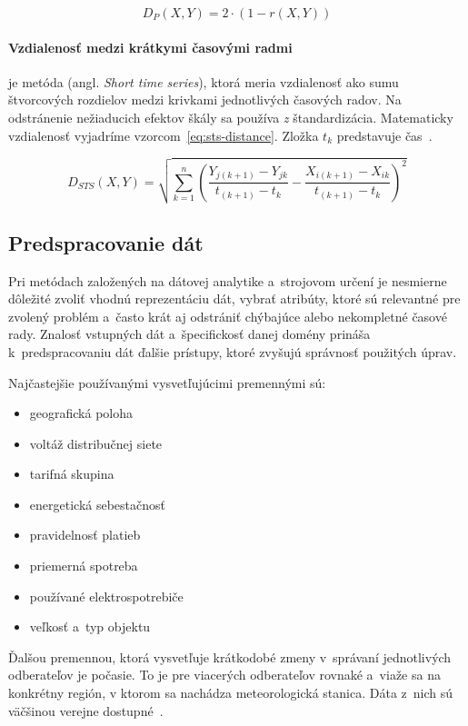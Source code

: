 \documentclass[a4paper,twoside,slovak,12pt,appendix]{article}
\begin{document}
\begin{equation}
	\label{eq:distance-golay}
  D_P \left( X, Y \right) = 2 \cdot \left( 1 - r \left( X, Y \right) \right)
\end{equation}

\paragraph{Vzdialenosť medzi krátkymi časovými radmi} je metóda (angl.
\textit{Short time series}), ktorá meria vzdialenosť ako sumu štvorcových
rozdielov medzi krivkami jednotlivých časových radov. Na odstránenie nežiaducich
efektov škály sa používa \textit{z} štandardizácia. Matematicky vzdialenosť
vyjadríme vzorcom~\ref{eq:sts-distance}. Zložka $t_k$ predstavuje
čas~\cite{WarrenLiao2005}.

\begin{equation}
	\label{eq:sts-distance}
  D_{STS} \left( X, Y \right) = \sqrt{ \sum_{k=1}^{n} \left(
    \frac{Y_{j \left( k+1 \right)} - Y_{jk}}{t_{\left( k+1 \right)} - t_k} -
    \frac{X_{i \left( k+1 \right)} - X_{ik}}{t_{\left( k+1 \right)} - t_k}
   \right)^2 }
\end{equation}


\subsection{Predspracovanie dát}
Pri metódach založených na dátovej analytike a~strojovom určení je nesmierne
dôležité zvoliť vhodnú reprezentáciu dát, vybrať atribúty, ktoré sú relevantné
pre zvolený problém a~často krát aj odstrániť chýbajúce alebo nekompletné časové
rady. Znalosť vstupných dát a~špecifickosť danej domény prináša
k~predspracovaniu dát ďalšie prístupy, ktoré zvyšujú správnosť použitých úprav.

Najčastejšie používanými vysvetľujúcimi premennými sú:
\begin{itemize}
  \item geografická poloha
  \item voltáž distribučnej siete
  \item tarifná skupina
  \item energetická sebestačnosť
  \item pravidelnosť platieb
  \item priemerná spotreba
  \item používané elektrospotrebiče
  \item veľkosť a~typ objektu
\end{itemize}
Ďalšou premennou, ktorá vysvetľuje krátkodobé zmeny v~správaní jednotlivých
odberateľov je počasie. To je pre viacerých odberateľov rovnaké a~viaže sa na
konkrétny región, v ktorom sa nachádza meteorologická stanica. Dáta z~nich sú
väčšinou verejne dostupné~\cite{Stankovic2014}.
\end{document}

